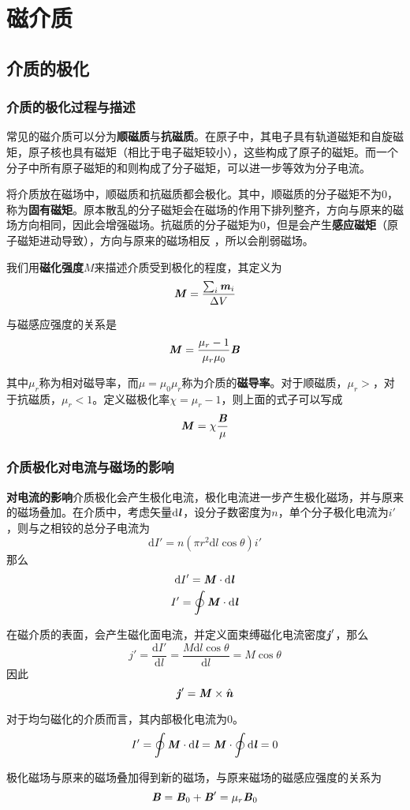 \documentclass[UTF8,openany]{book}
\begin{document}
\chapter{磁介质}
	\section{介质的极化}
	\subsection{介质的极化过程与描述}
	\par 常见的磁介质可以分为\textbf{顺磁质}与\textbf{抗磁质}。在原子中，其电子具有轨道磁矩和自旋磁矩，原子核也具有磁矩（相比于电子磁矩较小），这些构成了原子的磁矩。而一个分子中所有原子磁矩的和则构成了分子磁矩，可以进一步等效为分子电流。
	\par 将介质放在磁场中，顺磁质和抗磁质都会极化。其中，顺磁质的分子磁矩不为0，称为\textbf{固有磁矩}。原本散乱的分子磁矩会在磁场的作用下排列整齐，方向与原来的磁场方向相同，因此会增强磁场。抗磁质的分子磁矩为0，但是会产生\textbf{感应磁矩}（原子磁矩进动导致），方向与原来的磁场相反 ，所以会削弱磁场。
	\par 我们用\textbf{磁化强度}$M$来描述介质受到极化的程度，其定义为
	$$\textbf{\textit{M}}=\frac{\sum_{i}\textbf{\textit{m}}_i}{\Delta V}$$
	\par 与磁感应强度的关系是
	$$\textbf{\textit{M}}=\frac{\mu_r-1}{\mu_r\mu_0}\textbf{\textit{B}}$$
	\par 其中$\mu_r$称为相对磁导率，而$\mu=\mu_0\mu_r$称为介质的\textbf{磁导率}。对于顺磁质，$\mu_r>$，对于抗磁质，$\mu_r<1$。定义磁极化率$\chi=\mu_r-1$，则上面的式子可以写成
	$$\textbf{\textit{M}}=\chi\frac{\textbf{\textit{B}}}{\mu}$$
	\subsection{介质极化对电流与磁场的影响}
	\par \textbf{对电流的影响}\quad 介质极化会产生极化电流，极化电流进一步产生极化磁场，并与原来的磁场叠加。在介质中，考虑矢量$\mathrm{d}\textbf{\textit{l}}$，设分子数密度为$n$，单个分子极化电流为$i'$，则与之相铰的总分子电流为
	$$\mathrm{d}I'=n(\pi r^2\mathrm{d}l\cos\theta)i'$$
	那么
	$$\mathrm{d}I'=\textbf{\textit{M}}\cdot\mathrm{d}\textbf{\textit{l}}$$
	$$I'=\oint\textbf{\textit{M}}\cdot\mathrm{d}\textbf{\textit{l}}$$
	\par 在磁介质的表面，会产生磁化面电流，并定义面束缚磁化电流密度$\textbf{\textit{j}}'$，那么
	$$j'=\frac{\mathrm{d}I'}{\mathrm{d}l}=\frac{M\mathrm{d}l\cos\theta}{\mathrm{d}l}=M\cos\theta$$
	因此
	$$\textbf{\textit{j}}'=\textbf{\textit{M}}\times\hat{\textbf{\textit{n}}}$$
	\par 对于均匀磁化的介质而言，其内部极化电流为0。
	$$I'=\oint\textbf{\textit{M}}\cdot\mathrm{d}\textbf{\textit{l}}=\textbf{\textit{M}}\cdot\oint\mathrm{d}\textbf{\textit{l}}=0$$
	\par 极化磁场与原来的磁场叠加得到新的磁场，与原来磁场的磁感应强度的关系为
	$$\textbf{\textit{B}}=\textbf{\textit{B}}_0+\textbf{\textit{B}}'=\mu_r{\textbf{\textit{B}}_0}$$
\end{document}
